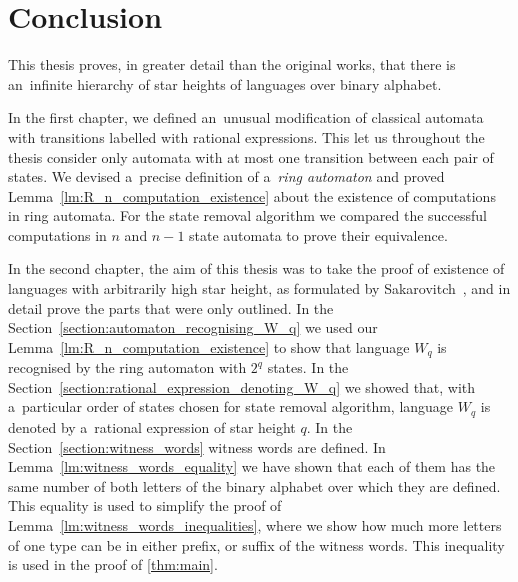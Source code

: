 \chapter*{Conclusion}

This thesis proves, in greater detail than the original works, that there is an~infinite hierarchy of star heights of languages over binary alphabet.

In the first chapter, we defined an~unusual modification of classical automata with transitions labelled with rational expressions. This let us throughout the thesis consider only automata with at most one transition between each pair of states. We devised a~precise definition of a~\emph{ring automaton} and proved Lemma~\ref*{lm:R_n_computation_existence} about the existence of computations in ring automata. For the state removal algorithm we compared the successful computations in $n$ and $n-1$ state automata to prove their equivalence.

In the second chapter, the aim of this thesis was to take the proof of existence of languages with arbitrarily high star height, as formulated by Sakarovitch~\cite{Sakarovitch09}, and in detail prove the parts that were only outlined. In the Section~\ref*{section:automaton_recognising_W_q} we used our Lemma~\ref*{lm:R_n_computation_existence} to show that language $W_q$ is recognised by the ring automaton with $2^q$ states. In the Section~\ref*{section:rational_expression_denoting_W_q} we showed that, with a~particular order of states chosen for state removal algorithm, language $W_q$ is denoted by a~rational expression of star height $q$. In the Section~\ref*{section:witness_words} witness words are defined. In Lemma~\ref*{lm:witness_words_equality} we have shown that each of them has the same number of both letters of the binary alphabet over which they are defined. This equality is used to simplify the proof of Lemma~\ref*{lm:witness_words_inequalities}, where we show how much more letters of one type can be in either prefix, or suffix of the witness words. This inequality is used in the proof of \autoref*{thm:main}.